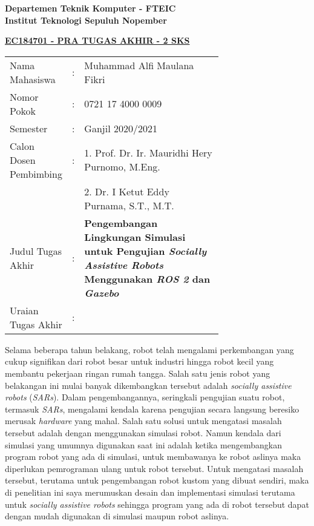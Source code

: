 \begin{flushleft}
  \textbf{Departemen Teknik Komputer - FTEIC}\\
  \textbf{Institut Teknologi Sepuluh Nopember}\\
\end{flushleft}

\begin{center}
  \underline{\textbf{EC184701 - PRA TUGAS AKHIR - 2 SKS}}
\end{center}

\begin{adjustwidth}{-0.2cm}{}
  \begin{tabular}{lcp{0.7\linewidth}}

    Nama Mahasiswa &:& Muhammad Alfi Maulana Fikri \\
    Nomor Pokok &:&	0721 17 4000 0009 \\

    Semester &:& Ganjil 2020/2021 \\

    Calon Dosen Pembimbing &:& 1. Prof. Dr. Ir. Mauridhi Hery Purnomo, M.Eng. \\
    & & 2. Dr. I Ketut Eddy Purnama, S.T., M.T. \\

    Judul Tugas Akhir &:& \textbf{Pengembangan Lingkungan Simulasi untuk Pengujian \emph{Socially Assistive Robots} Menggunakan \emph{ROS 2} dan \emph{Gazebo}} \\

    Uraian Tugas Akhir &:& \\
  \end{tabular}
\end{adjustwidth}

Selama beberapa tahun belakang, robot telah mengalami perkembangan yang cukup signifikan dari robot besar untuk industri hingga robot kecil yang membantu pekerjaan ringan rumah tangga.
Salah satu jenis robot yang belakangan ini mulai banyak dikembangkan tersebut adalah \emph{socially assistive robots} (\emph{SARs}).
Dalam pengembangannya, seringkali pengujian suatu robot, termasuk \emph{SARs}, mengalami kendala karena pengujian secara langsung beresiko merusak \emph{hardware} yang mahal.
Salah satu solusi untuk mengatasi masalah tersebut adalah dengan menggunakan simulasi robot.
Namun kendala dari simulasi yang umumnya digunakan saat ini adalah ketika mengembangkan program robot yang ada di simulasi, untuk membawanya ke robot aslinya maka diperlukan pemrograman ulang untuk robot tersebut.
Untuk mengatasi masalah tersebut, terutama untuk pengembangan robot kustom yang dibuat sendiri, maka di penelitian ini saya merumuskan desain dan implementasi simulasi terutama untuk \emph{socially assistive robots} sehingga program yang ada di robot tersebut dapat dengan mudah digunakan di simulasi maupun robot aslinya.
\vspace{1ex}

